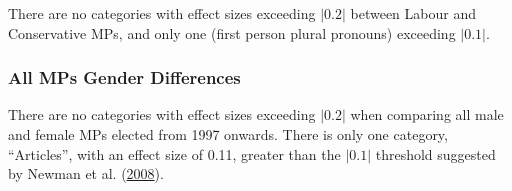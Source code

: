 \documentclass[]{article}
\theoremstyle{definition}
\theoremstyle{definition}
\theoremstyle{definition}
\theoremstyle{remark}
\begin{document}
There are no categories with effect sizes exceeding \(|0.2|\) between
Labour and Conservative MPs, and only one (first person plural pronouns)
exceeding \(|0.1|\).

\hypertarget{all-mps-gender-differences}{%
\subsubsection{All MPs Gender
Differences}\label{all-mps-gender-differences}}

There are no categories with effect sizes exceeding \(|0.2|\) when
comparing all male and female MPs elected from 1997 onwards. There is
only one category, ``Articles'', with an effect size of 0.11, greater
than the \(|0.1|\) threshold suggested by Newman et al.
(\protect\hyperlink{ref-newman2008}{2008}).
\end{document}
